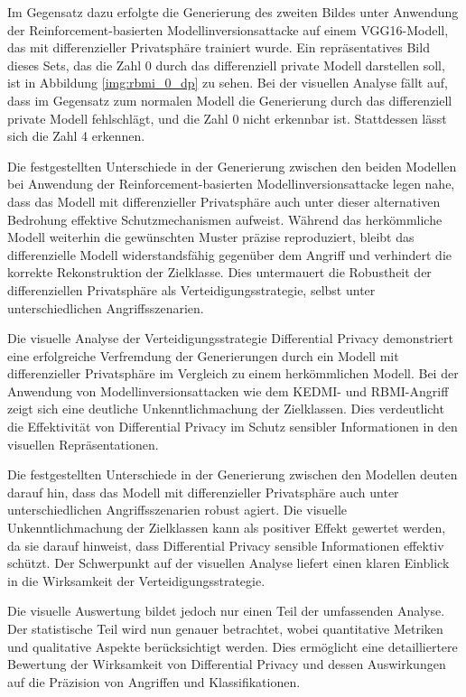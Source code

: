 Im Gegensatz dazu erfolgte die Generierung des zweiten Bildes unter Anwendung der Reinforcement-basierten Modellinversionsattacke auf einem VGG16-Modell, das mit differenzieller Privatsphäre trainiert wurde. Ein repräsentatives Bild dieses Sets, das die Zahl 0 durch das differenziell private Modell darstellen soll, ist in Abbildung \ref{img:rbmi_0_dp} zu sehen. Bei der visuellen Analyse fällt auf, dass im Gegensatz zum normalen Modell die Generierung durch das differenziell private Modell fehlschlägt, und die Zahl 0 nicht erkennbar ist. Stattdessen lässt sich die Zahl 4 erkennen.

Die festgestellten Unterschiede in der Generierung zwischen den beiden Modellen bei Anwendung der Reinforcement-basierten Modellinversionsattacke legen nahe, dass das Modell mit differenzieller Privatsphäre auch unter dieser alternativen Bedrohung effektive Schutzmechanismen aufweist. Während das herkömmliche Modell weiterhin die gewünschten Muster präzise reproduziert, bleibt das differenzielle Modell widerstandsfähig gegenüber dem Angriff und verhindert die korrekte Rekonstruktion der Zielklasse. Dies untermauert die Robustheit der differenziellen Privatsphäre als Verteidigungsstrategie, selbst unter unterschiedlichen Angriffsszenarien.

Die visuelle Analyse der Verteidigungsstrategie \glqq Differential Privacy\grqq{} demonstriert eine erfolgreiche Verfremdung der Generierungen durch ein Modell mit differenzieller Privatsphäre im Vergleich zu einem herkömmlichen Modell. Bei der Anwendung von Modellinversionsattacken wie dem \glqq KEDMI\grqq- und \glqq RBMI\grqq-Angriff zeigt sich eine deutliche Unkenntlichmachung der Zielklassen. Dies verdeutlicht die Effektivität von Differential Privacy im Schutz sensibler Informationen in den visuellen Repräsentationen.

Die festgestellten Unterschiede in der Generierung zwischen den Modellen deuten darauf hin, dass das Modell mit differenzieller Privatsphäre auch unter unterschiedlichen Angriffsszenarien robust agiert. Die visuelle Unkenntlichmachung der Zielklassen kann als positiver Effekt gewertet werden, da sie darauf hinweist, dass Differential Privacy sensible Informationen effektiv schützt. Der Schwerpunkt auf der visuellen Analyse liefert einen klaren Einblick in die Wirksamkeit der Verteidigungsstrategie.

Die visuelle Auswertung bildet jedoch nur einen Teil der umfassenden Analyse. Der statistische Teil wird nun genauer betrachtet, wobei quantitative Metriken und qualitative Aspekte berücksichtigt werden. Dies ermöglicht eine detailliertere Bewertung der Wirksamkeit von Differential Privacy und dessen Auswirkungen auf die Präzision von Angriffen und Klassifikationen.

